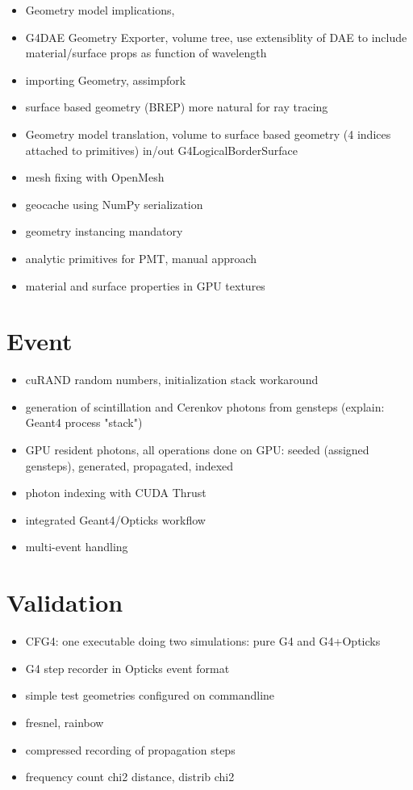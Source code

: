\documentclass[a4paper]{jpconf}
\begin{document}
\begin{itemize}
\item Geometry model implications, 
\item G4DAE Geometry Exporter, volume tree, use extensiblity of DAE to include material/surface props as function of wavelength
\item importing Geometry, assimpfork \cite{Assimp} \cite{AssimpFork}
\item surface based geometry (BREP) more natural for ray tracing 
\item Geometry model translation, volume to surface based geometry (4 indices attached to primitives) in/out G4LogicalBorderSurface
\item mesh fixing with OpenMesh\cite{OpenMesh}
\item geocache using NumPy serialization
\item geometry instancing mandatory
\item analytic primitives for PMT, manual approach 
\item material and surface properties in GPU textures
\end{itemize}

\section{Event}

\begin{itemize}
\item cuRAND random numbers, initialization stack workaround
\item generation of scintillation and Cerenkov photons from gensteps (explain: Geant4 process "stack")
\item GPU resident photons, all operations done on GPU: seeded (assigned gensteps), generated, propagated, indexed 
\item photon indexing with CUDA Thrust 
\item integrated Geant4/Opticks workflow
\item multi-event handling 
\end{itemize}

\section{Validation}

\begin{itemize}
\item CFG4: one executable doing two simulations: pure G4 and G4+Opticks 
\item G4 step recorder in Opticks event format
\item simple test geometries configured on commandline
\item fresnel, rainbow
\item compressed recording of propagation steps
\item frequency count chi2 distance, distrib chi2
\end{itemize}
\end{document}
